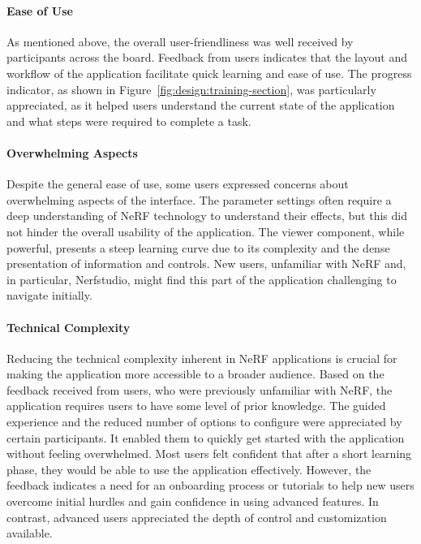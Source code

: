 \paragraph{Ease of Use}
As mentioned above, the overall user-friendliness was well received by participants across the board.
Feedback from users indicates that the layout and workflow of the application facilitate quick learning and ease of use.
\cite{P4, P5, P7, P8, P10}
The progress indicator, as shown in Figure~\ref{fig:design:training-section}, was particularly appreciated, as it helped users understand the current state of the application and what steps were required to complete a task.
\cite{P5, P7, P8, P9}


\paragraph{Overwhelming Aspects}
Despite the general ease of use, some users expressed concerns about overwhelming aspects of the interface.
The parameter settings often require a deep understanding of NeRF technology to understand their effects, but this did not hinder the overall usability of the application.
\cite{P5, P7}
The viewer component, while powerful, presents a steep learning curve due to its complexity and the dense presentation of information and controls. 
New users, unfamiliar with NeRF and, in particular, Nerfstudio, might find this part of the application challenging to navigate initially.
\cite{P2}


\paragraph{Technical Complexity}
Reducing the technical complexity inherent in NeRF applications is crucial for making the application more accessible to a broader audience.
Based on the feedback received from users, who were previously unfamiliar with NeRF, the application requires users to have some level of prior knowledge.
The guided experience and the reduced number of options to configure were appreciated by certain participants.
It enabled them to quickly get started with the application without feeling overwhelmed.
Most users felt confident that after a short learning phase, they would be able to use the application effectively.
\cite{P2, P3, P4, P5, P6, P7, P8}
However, the feedback indicates a need for an onboarding process or tutorials to help new users overcome initial hurdles and gain confidence in using advanced features.
In contrast, advanced users appreciated the depth of control and customization available.
\cite{P9, P10}

